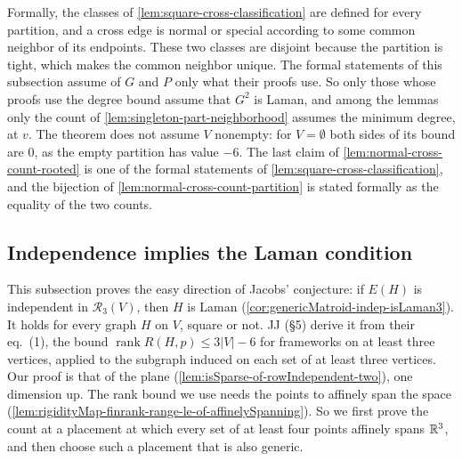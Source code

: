\begin{fmlnote}
  \label{fmlnote:normal-cross-split}
  Formally, the classes of \cref{lem:square-cross-classification} are
  defined for every partition, and a cross edge is normal or special
  according to some common neighbor of its endpoints. These two classes
  are disjoint because the partition is tight, which makes the common
  neighbor unique. The formal statements of this subsection assume of
  $G$ and $P$ only what their proofs use. So only those whose proofs use
  the degree bound assume that $G^2$ is Laman, and among the lemmas only
  the count of \cref{lem:singleton-part-neighborhood} assumes the
  minimum degree, at $v$. The theorem does not assume $V$ nonempty: for
  $V = \emptyset$ both sides of its bound are $0$, as the empty
  partition has value $-6$. The last claim of
  \cref{lem:normal-cross-count-rooted} is one of the formal statements of
  \cref{lem:square-cross-classification}, and the bijection of
  \cref{lem:normal-cross-count-partition} is stated formally as the
  equality of the two counts.
\end{fmlnote}

\subsection{Independence implies the Laman condition}
\label{sec:jacobs-easy}

This subsection proves the easy direction of Jacobs' conjecture: if
$E(H)$ is independent in $\mathcal{R}_3(V)$, then $H$ is Laman
(\cref{cor:genericMatroid-indep-isLaman3}). It holds for every graph $H$
on $V$, square or not. JJ (\S5) derive it from their eq.~(1), the bound
$\operatorname{rank} R(H, p) \le 3|V| - 6$ for frameworks on at least
three vertices, applied to the subgraph induced on each set of at least
three vertices. Our proof is that of the plane
(\cref{lem:isSparse-of-rowIndependent-two}), one dimension up. The rank
bound we use needs the points to affinely span the space
(\cref{lem:rigidityMap-finrank-range-le-of-affinelySpanning}). So we
first prove the count at a placement at which every set of at least four
points affinely spans ${\mathbb{R}}^3$, and then choose such a placement that is
also generic.

